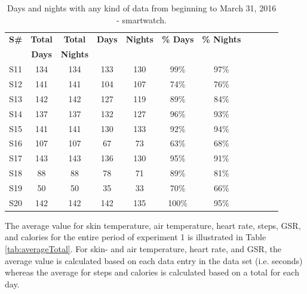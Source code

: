 \documentclass[12pt]{article} %
\begin{document}
\begin{table}[H]
\center
\begin{footnotesize}
	\begin{tabular}{| c | c | c || c | c | c | c | c | c | c | c |}
	\hline
	\textbf{S\#} & \textbf{Total} & \textbf{Total} & \textbf{Days} & \textbf{Nights} & \textbf{\% Days} & \textbf{\% Nights}\\
	& \textbf{Days} & \textbf{Nights} & & & &\\
	\hline
	S11 & 134 & 134 & 133 & 130 & 99\% & 97\%\\
	\hline
	S12 & 141 & 141 & 104 & 107 & 74\% & 76\% \\
	\hline
	S13 & 142 & 142 & 127 & 119 & 89\% & 84\%\\
	\hline
	S14 & 137 & 137 & 132 & 127 & 96\% & 93\%\\
	\hline
	S15 & 141 & 141 & 130 & 133 & 92\% & 94\% \\
	\hline
	S16 & 107 & 107 & 67 & 73 & 63\% & 68\%\\
	\hline
	S17 & 143 & 143 & 136 & 130 & 95\% & 91\% \\
	\hline
	S18 & 88 & 88 & 78 & 71 & 89\% & 81\%\\
	\hline
	S19 & 50 & 50 & 35 & 33 & 70\% & 66\%\\
	\hline
	S20 & 142 & 142 & 142 & 135 & 100\% & 95\%\\
	\hline
	\end{tabular}
	\caption{Days and nights with any kind of data from beginning to March 31, 2016 - smartwatch.}
	\label{tab:daysNightsExp1}
\end{footnotesize}
\end{table}

The average value for skin temperature, air temperature, heart rate, steps, GSR, and calories for the entire period of experiment 1 is illustrated in Table \ref{tab:averageTotal}. For skin- and air temperature, heart rate, and GSR, the average value is calculated based on each data entry in the data set (i.e. seconds) whereas the average for steps and calories is calculated based on a total for each day. 
\end{document}
